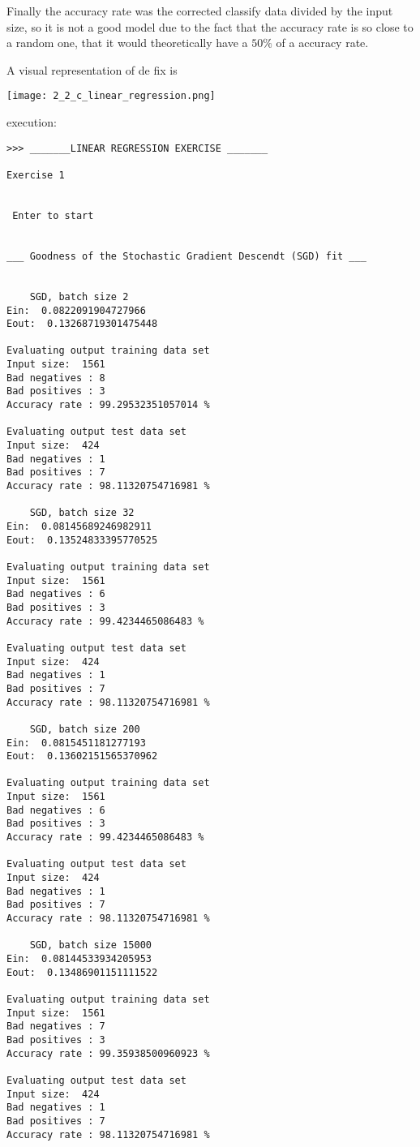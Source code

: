 Finally the accuracy rate was the corrected classify data divided by the input size, so it is not a good model due to the fact that the accuracy rate is so close to a random one, that it would theoretically have a $50\%$ of a accuracy rate.

A visual representation of de fix is


\texttt{[image: 2\_2\_c\_linear\_regression.png]}





execution:
\begin{verbatim}
>>> _______LINEAR REGRESSION EXERCISE _______

Exercise 1


 Enter to start


___ Goodness of the Stochastic Gradient Descendt (SGD) fit ___


	SGD, batch size 2
Ein:  0.0822091904727966
Eout:  0.13268719301475448

Evaluating output training data set
Input size:  1561
Bad negatives : 8
Bad positives : 3
Accuracy rate : 99.29532351057014 %

Evaluating output test data set
Input size:  424
Bad negatives : 1
Bad positives : 7
Accuracy rate : 98.11320754716981 %

	SGD, batch size 32
Ein:  0.08145689246982911
Eout:  0.13524833395770525

Evaluating output training data set
Input size:  1561
Bad negatives : 6
Bad positives : 3
Accuracy rate : 99.4234465086483 %

Evaluating output test data set
Input size:  424
Bad negatives : 1
Bad positives : 7
Accuracy rate : 98.11320754716981 %

	SGD, batch size 200
Ein:  0.0815451181277193
Eout:  0.13602151565370962

Evaluating output training data set
Input size:  1561
Bad negatives : 6
Bad positives : 3
Accuracy rate : 99.4234465086483 %

Evaluating output test data set
Input size:  424
Bad negatives : 1
Bad positives : 7
Accuracy rate : 98.11320754716981 %

	SGD, batch size 15000
Ein:  0.08144533934205953
Eout:  0.13486901151111522

Evaluating output training data set
Input size:  1561
Bad negatives : 7
Bad positives : 3
Accuracy rate : 99.35938500960923 %

Evaluating output test data set
Input size:  424
Bad negatives : 1
Bad positives : 7
Accuracy rate : 98.11320754716981 %


\end{verbatim}
